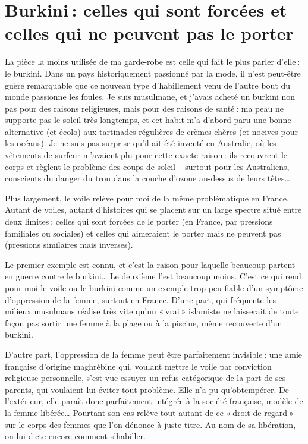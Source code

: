 \section{Burkini : celles qui sont forcées et celles qui ne peuvent pas le porter}


La pièce la moins utilisée de ma garde-robe est celle qui fait le plus parler d’elle : le burkini. Dans un pays historiquement passionné par la mode, il n’est peut-être guère remarquable que ce nouveau type d’habillement venu de l’autre bout du monde passionne les foules. Je suis musulmane, et j’avais acheté un burkini non pas pour des raisons religieuses, mais pour des raisons de santé : ma peau ne supporte pas le soleil très longtemps, et cet habit m’a d’abord paru une bonne alternative (et écolo) aux tartinades régulières de crèmes chères (et nocives pour les océans). Je ne suis pas surprise qu’il ait été inventé en Australie, où les vêtements de surfeur m’avaient plu pour cette exacte raison : ils recouvrent le corps et règlent le problème des coups de soleil – surtout pour les Australiens, conscients du danger du trou dans la couche d’ozone au-dessus de leurs têtes…

Plus largement, le voile relève pour moi de la même problématique en France. Autant de voiles, autant d’histoires qui se placent sur un large spectre situé entre deux limites : celles qui sont forcées de le porter (en France, par pressions familiales ou sociales) et celles qui aimeraient le porter mais ne peuvent pas (pressions similaires mais inverses).

Le premier exemple est connu, et c’est la raison pour laquelle beaucoup partent en guerre contre le burkini… Le deuxième l’est beaucoup moins. C’est ce qui rend pour moi le voile ou le burkini comme un exemple trop peu fiable d’un symptôme d’oppression de la femme, surtout en France. D’une part, qui fréquente les milieux musulmans réalise très vite qu’un « vrai » islamiste ne laisserait de toute façon pas sortir une femme à la plage ou à la piscine, même recouverte d’un burkini.

D’autre part, l’oppression de la femme peut être parfaitement invisible : une amie française d’origine maghrébine qui, voulant mettre le voile par conviction religieuse personnelle, s’est vue essuyer un refus catégorique de la part de ses parents, qui voulaient lui éviter tout problème. Elle n’a pu qu’obtempérer. De l’extérieur, elle paraît donc parfaitement intégrée à la société française, modèle de la femme libérée… Pourtant son cas relève tout autant de ce « droit de regard » sur le corps des femmes que l’on dénonce à juste titre. Au nom de sa libération, on lui dicte encore comment s’habiller.

